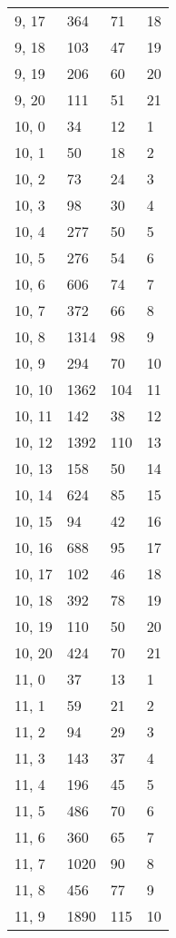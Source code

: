 \begin{table}
\begin{tabular}{llll}
9, 17  &     364 &   71 &    18 \\
9, 18  &     103 &   47 &    19 \\
9, 19  &     206 &   60 &    20 \\
9, 20  &     111 &   51 &    21 \\
10, 0  &      34 &   12 &     1 \\
10, 1  &      50 &   18 &     2 \\
10, 2  &      73 &   24 &     3 \\
10, 3  &      98 &   30 &     4 \\
10, 4  &     277 &   50 &     5 \\
10, 5  &     276 &   54 &     6 \\
10, 6  &     606 &   74 &     7 \\
10, 7  &     372 &   66 &     8 \\
10, 8  &    1314 &   98 &     9 \\
10, 9  &     294 &   70 &    10 \\
10, 10 &    1362 &  104 &    11 \\
10, 11 &     142 &   38 &    12 \\
10, 12 &    1392 &  110 &    13 \\
10, 13 &     158 &   50 &    14 \\
10, 14 &     624 &   85 &    15 \\
10, 15 &      94 &   42 &    16 \\
10, 16 &     688 &   95 &    17 \\
10, 17 &     102 &   46 &    18 \\
10, 18 &     392 &   78 &    19 \\
10, 19 &     110 &   50 &    20 \\
10, 20 &     424 &   70 &    21 \\
11, 0  &      37 &   13 &     1 \\
11, 1  &      59 &   21 &     2 \\
11, 2  &      94 &   29 &     3 \\
11, 3  &     143 &   37 &     4 \\
11, 4  &     196 &   45 &     5 \\
11, 5  &     486 &   70 &     6 \\
11, 6  &     360 &   65 &     7 \\
11, 7  &    1020 &   90 &     8 \\
11, 8  &     456 &   77 &     9 \\
11, 9  &    1890 &  115 &    10 \\

\end{tabular}
\end{table}
